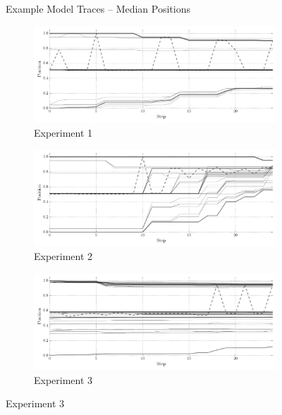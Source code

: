 \begin{figure}[!htbp]
    \caption{Example Model Traces -- Median Positions}
    \label{fig:example_traces}
    \figSpace
\end{figure}

\begin{figure}[!htbp]
    \centering
    \begin{subfigure}[t]{0.75\textwidth}
        \includegraphics[width=\textwidth]{ColdWar/Figures/Exp1_agent_traces}
        \caption{Experiment 1}
    \end{subfigure}

    \begin{subfigure}[t]{0.75\textwidth}
        \includegraphics[width=\textwidth]{ColdWar/Figures/Exp2_agent_traces}
        \caption{Experiment 2}
    \end{subfigure}

    \begin{subfigure}[t]{0.75\textwidth}
        \includegraphics[width=\textwidth]{ColdWar/Figures/Exp3_agent_traces}
        \caption{Experiment 3}
    \end{subfigure}


\end{figure}
